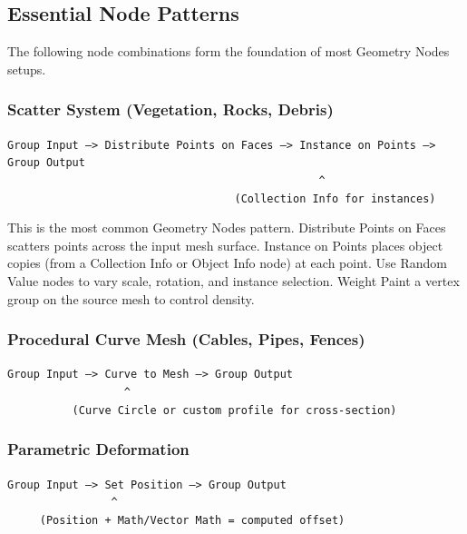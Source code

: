 \subsection{Essential Node Patterns}
\label{sec:gnpatterns}

The following node combinations form the foundation of most Geometry Nodes setups.

\subsubsection{Scatter System (Vegetation, Rocks, Debris)}

\begin{codebox}
\texttt{Group Input --> Distribute Points on Faces --> Instance on Points --> Group Output}\\
\texttt{\ \ \ \ \ \ \ \ \ \ \ \ \ \ \ \ \ \ \ \ \ \ \ \ \ \ \ \ \ \ \ \ \ \ \ \ \ \ \ \ \ \ \ \ \ \ \ \ \^{}}\\
\texttt{\ \ \ \ \ \ \ \ \ \ \ \ \ \ \ \ \ \ \ \ \ \ \ \ \ \ \ \ \ \ \ \ \ \ \ (Collection Info for instances)}
\end{codebox}

This is the most common Geometry Nodes pattern. Distribute Points on Faces scatters points across the input mesh surface. Instance on Points places object copies (from a Collection Info or Object Info node) at each point. Use Random Value nodes to vary scale, rotation, and instance selection. Weight Paint a vertex group on the source mesh to control density.

\subsubsection{Procedural Curve Mesh (Cables, Pipes, Fences)}

\begin{codebox}
\texttt{Group Input --> Curve to Mesh --> Group Output}\\
\texttt{\ \ \ \ \ \ \ \ \ \ \ \ \ \ \ \ \ \ \^{}}\\
\texttt{\ \ \ \ \ \ \ \ \ \ (Curve Circle or custom profile for cross-section)}
\end{codebox}

\subsubsection{Parametric Deformation}

\begin{codebox}
\texttt{Group Input --> Set Position --> Group Output}\\
\texttt{\ \ \ \ \ \ \ \ \ \ \ \ \ \ \ \ \^{}}\\
\texttt{\ \ \ \ \ (Position + Math/Vector Math = computed offset)}
\end{codebox}

